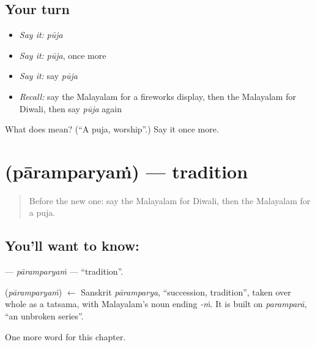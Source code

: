 \subsection*{Your turn}
\begin{itemize}
\raggedright
  \item \emph{Say it:} \emph{pūja}
  \item \emph{Say it:} \emph{pūja}, once more
  \item \emph{Say it:} say \emph{pūja}
  \item \emph{Recall:} say the Malayalam for a fireworks display, then the Malayalam for Diwali, then say \emph{pūja} again
\end{itemize}

\begin{tcolorbox}[breakable,colback=teal!4,colframe=teal!35!black,title={Before you move on}]
What does  mean? (\textquotedblleft{}A puja, worship\textquotedblright{}.) Say it once more.
\end{tcolorbox}
\section[\texorpdfstring{\ml{പാരമ്പര്യം} (pāramparyaṁ)}{പാരമ്പര്യം (pāramparyaṁ)}]{ (pāramparyaṁ) — tradition}

\label{lesson:ML-C326-paramparyam}



\begin{quote}
Before the new one: say the Malayalam for Diwali, then the Malayalam for a puja.
\end{quote}

\subsection*{You'll want to know: }
\textbf{} — \emph{pāramparyaṁ} — \textquotedblleft{}tradition\textquotedblright{}.

\begin{cousinweb}
\textbf{} (\emph{pāramparyaṁ}) $\leftarrow$ Sanskrit \emph{pāramparya}, \textquotedblleft{}succession, tradition\textquotedblright{}, taken over whole as a tatsama, with Malayalam's noun ending \emph{-ṁ}. It is built on \emph{paramparā}, \textquotedblleft{}an unbroken series\textquotedblright{}.
\end{cousinweb}

\begin{grammarlens}[title={What you've built}]
One more word for this chapter.
\end{grammarlens}

